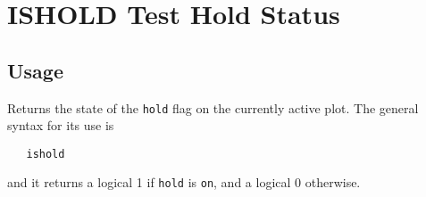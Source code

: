 \section{ISHOLD Test Hold Status}

\subsection{Usage}

Returns the state of the \verb|hold| flag on the currently active
plot.  The general syntax for its use is
\begin{verbatim}
   ishold
\end{verbatim}
and it returns a logical 1 if \verb|hold| is \verb|on|, and a logical
0 otherwise.
